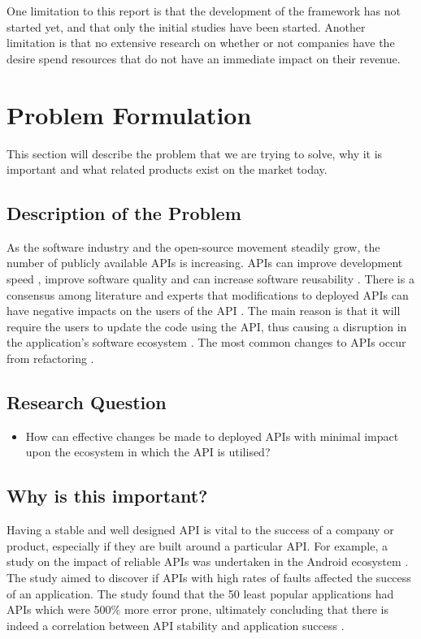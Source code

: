 \documentclass{article}
\begin{document}
One limitation to this report is that the development of the framework has not started yet, and that only the initial studies have been started. Another limitation is that no extensive research on whether or not companies have the desire spend resources that do not have an immediate impact on their revenue. 

\section{Problem Formulation}
This section will describe the problem that we are trying to solve, why it is important and what related products exist on the market today.

\subsection{Description of the Problem}

As the software industry and the open-source movement steadily grow, the number of publicly available APIs is increasing. APIs can improve development speed \cite{stylos2006comparing}, improve software quality \cite{stylos2006comparing} and can increase software reusability \cite{afonso2012evaluating}. There is a consensus among literature and experts that modifications to deployed APIs can have negative impacts on the users of the API \cite{google_talk} \cite{mcdonnell2013empirical} \cite{robbes2012developers} \cite{henning2007api}. The main reason is that it will require the users to update the code using the API, thus causing a disruption in the application's software ecosystem \cite{messerschmitt2005software}. The most common changes to APIs occur from refactoring \cite{dig2005role} \cite{xing2006refactoring}.

\subsection{Research Question}
\begin{itemize}
\item How can effective changes be made to deployed APIs with minimal impact upon the ecosystem in which the API is utilised?
\end{itemize}

\subsection{Why is this important?}
Having a stable and well designed API is vital to the success of a company or product, especially if they are built around a particular API. For example, a study on the impact of reliable APIs was undertaken in the Android ecosystem \cite{mcdonnell2013empirical}. The study aimed to discover if APIs with high rates of faults affected the success of an application. The study found that the 50 least popular applications had APIs which were 500\% more error prone, ultimately concluding that there is indeed a correlation between API stability and application success \cite{mcdonnell2013empirical}. \smallskip
\end{document}
